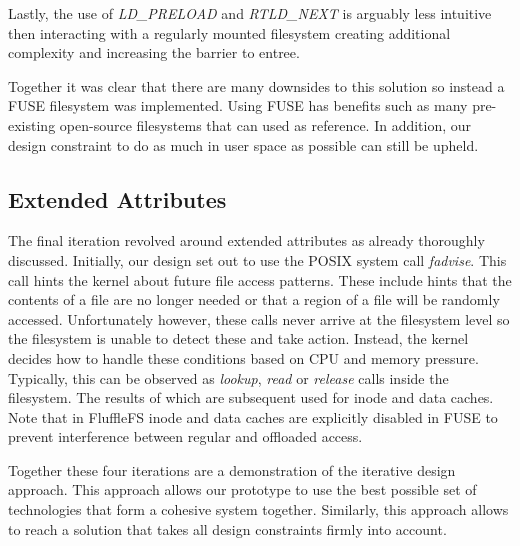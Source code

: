 Lastly, the use of \textit{LD\_PRELOAD} and \textit{RTLD\_NEXT} is arguably
less intuitive then interacting with a regularly mounted filesystem creating
additional complexity and increasing the barrier to entree.

Together it was clear that there are many downsides to this solution so instead
a FUSE filesystem was implemented. Using FUSE has benefits such as many
pre-existing open-source filesystems that can used as reference. In addition,
our design constraint to do as much in user space as possible can still be
upheld.

\subsection{Extended Attributes}

The final iteration revolved around extended attributes as already thoroughly
discussed. Initially, our design set out to use the POSIX system call
\textit{fadvise}. This call hints the kernel about future file access
patterns. These include hints that the contents of a file are no longer
needed or that a region of a file will be randomly accessed. Unfortunately
however, these calls never arrive at the filesystem level so the filesystem is
unable to detect these and take action. Instead, the kernel decides how to
handle these conditions based on CPU and memory pressure. Typically, this
can be observed as \textit{lookup}, \textit{read} or \textit{release} calls
inside the filesystem. The results of which are subsequent used for inode and
data caches. Note that in FluffleFS inode and data caches are explicitly
disabled in FUSE to prevent interference between regular and offloaded access.

Together these four iterations are a demonstration of the iterative design
approach. This approach allows our prototype to use the best possible set
of technologies that form a cohesive system together. Similarly, this approach
allows to reach a solution that takes all design constraints firmly into
account.

